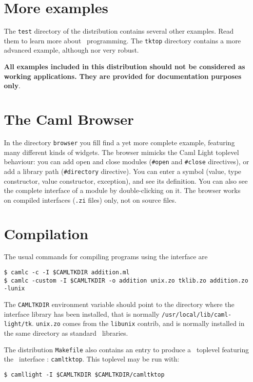 \section{More examples}
The \verb|test| directory of the distribution contains several other
examples. Read them to learn more about \caml\tk\ programming.
The \verb|tktop| directory contains a more advanced example, although
nor very robust.

{\bf All examples included in this distribution  should not be considered as
working applications. They are provided for documentation purposes only}.

\section{The Caml Browser}
In the directory {\tt browser} you fill find a yet more complete example,
featuring many different kinds of widgets. The browser mimicks the Caml
Light toplevel behaviour: you can add open and close modules ({\tt \#open} and
{\tt \#close} directives), or add a library path ({\tt \#directory} directive).
You can enter a symbol (value, type constructor, value constructor,
exception), and see its definition. You can also see the complete interface
of a module by double-clicking on it.
The browser works on compiled interfaces ({\tt .zi} files) only, not on
source files.

\section{Compilation}
The usual commands for compiling programs using the \caml\tk interface are
\begin{verbatim}
$ camlc -c -I $CAMLTKDIR addition.ml
$ camlc -custom -I $CAMLTKDIR -o addition unix.zo tklib.zo addition.zo -lunix
\end{verbatim} 
The \verb|CAMLTKDIR| environment variable should point to the directory where
the interface library has been installed, that is normally
\verb|/usr/local/lib/caml-light/tk|. \verb|unix.zo| comes from the
\verb|libunix| contrib, and is normally installed in the same directory as
standard \caml\ libraries. 

The distribution \verb|Makefile| also contains an entry to produce a \caml\
toplevel featuring the \tk\ interface : \verb|camltktop|.
This toplevel may be run with: 
\begin{verbatim}
$ camllight -I $CAMLTKDIR $CAMLTKDIR/camltktop
\end{verbatim} 

